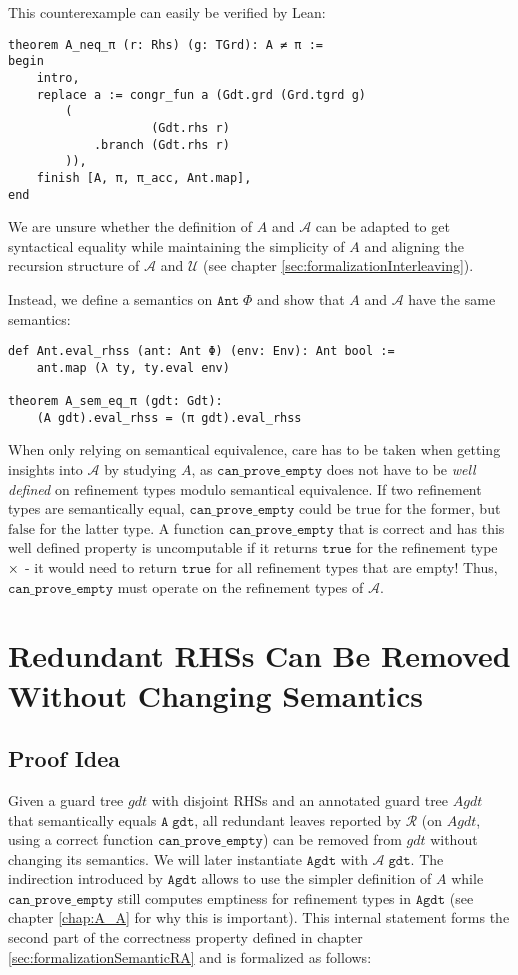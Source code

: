 This counterexample can easily be verified by Lean:
\begin{verbatim}
theorem A_neq_π (r: Rhs) (g: TGrd): A ≠ π :=
begin
    intro,
    replace a := congr_fun a (Gdt.grd (Grd.tgrd g)
        (
                    (Gdt.rhs r)
            .branch (Gdt.rhs r)
        )),
    finish [A, π, π_acc, Ant.map],
end
\end{verbatim}

We are unsure whether the definition of $A$ and $\mathcal{A}$ can be adapted to get syntactical equality
while maintaining the simplicity of $A$ and aligning the recursion structure of $\mathcal{A}$ and $\mathcal{U}$ (see chapter \ref{sec:formalizationInterleaving}).

Instead, we define a semantics on $\mathtt{Ant}\;\Phi$ and show that $A$ and $\mathcal{A}$ have the same semantics:
\begin{verbatim}
def Ant.eval_rhss (ant: Ant Φ) (env: Env): Ant bool :=
    ant.map (λ ty, ty.eval env)
    
theorem A_sem_eq_π (gdt: Gdt):
    (A gdt).eval_rhss = (π gdt).eval_rhss
\end{verbatim}

When only relying on semantical equivalence, care has to be taken when getting insights into $\mathcal{A}$ by studying $A$,
as $\mathtt{can\_prove\_empty}$ does not have to be \textit{well defined}
on refinement types modulo semantical equivalence. If two refinement types are semantically equal,
$\mathtt{can\_prove\_empty}$ could be $\mathrm{true}$ for the former, but $\mathrm{false}$ for the latter type.
A function $\mathtt{can\_prove\_empty}$ that is correct and has this well defined property is uncomputable if it returns $\mathtt{true}$ for the refinement type $\times$ - it would need to return $\mathtt{true}$ for all refinement types that are empty!
Thus, $\mathtt{can\_prove\_empty}$ must operate on the refinement types of $\mathcal{A}$.

\section{Redundant RHSs Can Be Removed Without Changing Semantics}\label{sec:proofRedRemovable}

\subsection{Proof Idea}

Given a guard tree $gdt$ with disjoint RHSs
and an annotated guard tree $Agdt$ that semantically equals $\mathtt{A}\;\mathtt{gdt}$,
all redundant leaves reported by $\mathcal{R}$ (on $Agdt$, using a correct function $\mathtt{can\_prove\_empty}$) can be removed from $gdt$ without changing its semantics.
We will later instantiate $\mathtt{Agdt}$ with $\mathcal{A}\;\mathtt{gdt}$.
The indirection introduced by $\mathtt{Agdt}$ allows to use the simpler definition of $A$ while $\mathtt{can\_prove\_empty}$ still computes emptiness for refinement types in $\mathtt{Agdt}$ (see chapter \ref{chap:A_A} for why this is important).
This internal statement forms the second part of the correctness property defined in chapter \ref{sec:formalizationSemanticRA} and is formalized as follows:

